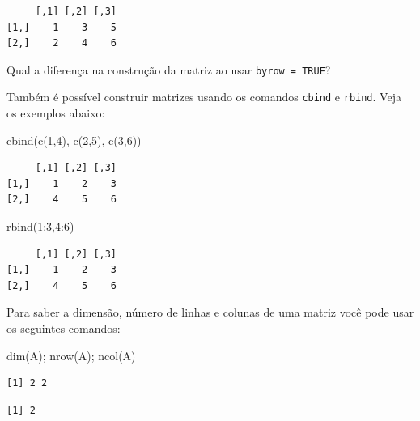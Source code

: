 \documentclass[
  letterpaper,
  DIV=11,
  numbers=noendperiod]{scrreprt}
\newenvironment{Shaded}{\begin{snugshade}}{\end{snugshade}}
\newcommand{\DecValTok}[1]{\textcolor[rgb]{0.68,0.00,0.00}{#1}}
\newcommand{\FunctionTok}[1]{\textcolor[rgb]{0.28,0.35,0.67}{#1}}
\newcommand{\NormalTok}[1]{\textcolor[rgb]{0.00,0.23,0.31}{#1}}
\newcommand{\SpecialCharTok}[1]{\textcolor[rgb]{0.37,0.37,0.37}{#1}}
\begin{document}
\begin{verbatim}
     [,1] [,2] [,3]
[1,]    1    3    5
[2,]    2    4    6
\end{verbatim}

Qual a diferença na construção da matriz ao usar
\texttt{byrow\ =\ TRUE}?

Também é possível construir matrizes usando os comandos \texttt{cbind} e
\texttt{rbind}. Veja os exemplos abaixo:

\begin{Shaded}
\begin{Highlighting}[]
\FunctionTok{cbind}\NormalTok{(}\FunctionTok{c}\NormalTok{(}\DecValTok{1}\NormalTok{,}\DecValTok{4}\NormalTok{), }\FunctionTok{c}\NormalTok{(}\DecValTok{2}\NormalTok{,}\DecValTok{5}\NormalTok{), }\FunctionTok{c}\NormalTok{(}\DecValTok{3}\NormalTok{,}\DecValTok{6}\NormalTok{))}
\end{Highlighting}
\end{Shaded}

\begin{verbatim}
     [,1] [,2] [,3]
[1,]    1    2    3
[2,]    4    5    6
\end{verbatim}

\begin{Shaded}
\begin{Highlighting}[]
\FunctionTok{rbind}\NormalTok{(}\DecValTok{1}\SpecialCharTok{:}\DecValTok{3}\NormalTok{,}\DecValTok{4}\SpecialCharTok{:}\DecValTok{6}\NormalTok{)}
\end{Highlighting}
\end{Shaded}

\begin{verbatim}
     [,1] [,2] [,3]
[1,]    1    2    3
[2,]    4    5    6
\end{verbatim}

Para saber a dimensão, número de linhas e colunas de uma matriz você
pode usar os seguintes comandos:

\begin{Shaded}
\begin{Highlighting}[]
\FunctionTok{dim}\NormalTok{(A); }\FunctionTok{nrow}\NormalTok{(A); }\FunctionTok{ncol}\NormalTok{(A)}
\end{Highlighting}
\end{Shaded}

\begin{verbatim}
[1] 2 2
\end{verbatim}

\begin{verbatim}
[1] 2
\end{verbatim}
\end{document}
